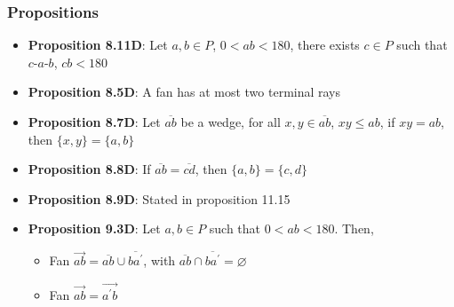 \documentclass{report}
\begin{document}
    \bigbreak \noindent 
    \subsubsection{Propositions}
    \begin{itemize}
        \item \textbf{Proposition 8.11D}: Let $a,b \in P$, $0 < ab < 180$, there exists $c\in P$ such that $ c\text{-}a\text{-}b$, $cb < 180$
        \item \textbf{Proposition 8.5D}: A fan has at most two terminal rays 
        \item \textbf{Proposition 8.7D}: Let $\overline{ab}$ be a wedge, for all $x,y \in \overline{ab}$, $xy \leq ab$, if $xy = ab$, then $\{x,y\} = \{a,b\}$
        \item \textbf{Proposition 8.8D}: If $\overline{ab}  = \overline{cd}$, then $\{a,b\} = \{c,d\}$
        \item \textbf{Proposition 8.9D}: Stated in proposition 11.15
        \item \textbf{Proposition 9.3D}: Let $a,b \in P$ such that $0 < ab < 180$. Then,
            \begin{itemize}
                \item Fan $\overrightarrow{ab} = \overline{ab} \cup \overline{ba^{\prime}}$, with $\overline{ab} \cap \overline{ba^{\prime}}  = \varnothing$
                \item Fan $\overrightarrow{ab} = \overrightarrow{a^{\prime}b} $
            \end{itemize}
    \end{itemize}

    \pagebreak 
    \bigbreak \noindent 
\end{document}
